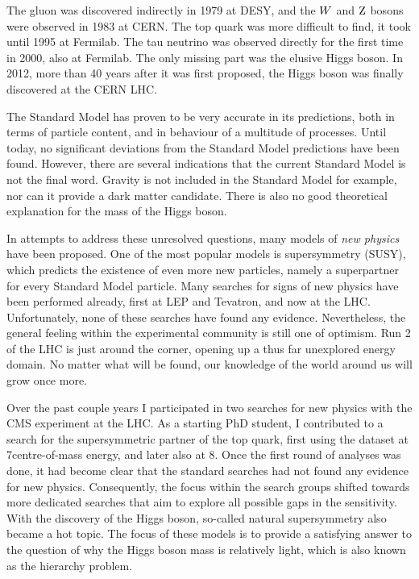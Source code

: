 The gluon was discovered indirectly in 1979 at DESY, and the $W$ and $\mathrm{Z}$ bosons were observed
in 1983 at CERN. The top quark was more difficult to find, it took until 1995 at Fermilab. The tau
neutrino was observed directly for the first time in 2000, also at Fermilab. The only missing part
was the elusive Higgs boson. In 2012, more than 40 years after it was first proposed, the Higgs
boson was finally discovered at the CERN LHC.

The Standard Model has proven to be very accurate in its predictions, both in terms of particle
content, and in behaviour of a multitude of processes. Until today, no significant deviations from
the Standard Model predictions have been found. However, there are several indications that the
current Standard Model is not the final word. Gravity is not included in the Standard Model for
example, nor can it provide a dark matter candidate. There is also no good theoretical explanation
for the mass of the Higgs boson. 

In attempts to address these unresolved questions, many models of \textit{new physics} have been
proposed. One of the most popular models is supersymmetry (SUSY), which predicts the existence of
even more new particles, namely a superpartner for every Standard Model particle. 
Many searches for signs of new physics have been performed already, first at LEP and Tevatron, and
now at the LHC. Unfortunately, none of these searches have found any evidence.
Nevertheless, the general feeling within the experimental community is still one of optimism. Run 2
of the LHC is just around the corner, opening up a thus far unexplored energy domain. No matter what
will be found, our knowledge of the world around us will grow once more. 

Over the past couple years I participated in two searches for new physics with the CMS experiment at
the LHC. As a starting PhD student, I contributed to a search for the supersymmetric partner of the
top quark, first using the dataset at 7\TeV centre-of-mass energy, and later also at 8\TeV. 
Once the first round of analyses was done, it had become clear that the standard searches had not
found any evidence for new physics. Consequently, the focus within the search groups shifted towards
more dedicated searches that aim to explore all possible gaps in the sensitivity. 
With the discovery of the Higgs boson, so-called natural supersymmetry also became a hot topic. 
The focus of these models is to provide a satisfying answer to the question of why the Higgs boson
mass is relatively light, which is also known as the hierarchy problem. 

